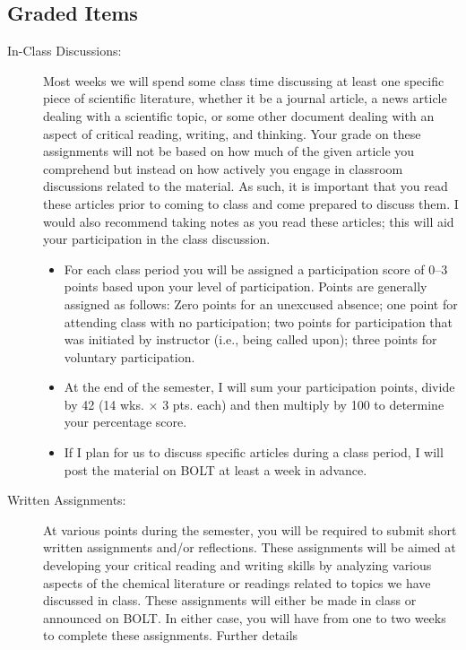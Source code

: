 \documentclass[11pt,letterpaper]{article}
\begin{document}
\subsection{Graded Items}
\begin{description}
	\item[In-Class Discussions:]
		Most weeks we will spend some class time discussing at least one
		specific piece of scientific literature, whether it be a journal
		article, a news article dealing with a scientific topic, or some
		other document dealing with an aspect of critical reading,
		writing, and thinking. Your grade on these assignments will not
		be based on how much of the given article you comprehend but
		instead on how actively you engage in classroom discussions
		related to the material. As such, it is important that you read
		these articles prior to coming to class and come prepared to
		discuss them. I would also recommend taking notes as you read
		these articles; this will aid your participation in the class
		discussion.
		\begin{itemize}
			\item For each class period you will be assigned a
				participation score of 0--3 points based upon
				your level of participation. Points are
				generally assigned as follows: Zero points for
				an unexcused absence; one point for attending
				class with no participation; two points for
				participation that was initiated by instructor
				(i.e., being called upon); three points for
				voluntary participation.
			\item At the end of the semester, I will sum your
				participation points, divide by 42 (14 wks.
				$\times$ 3
				pts. each) and then multiply by 100 to determine
				your percentage score.
			\item If I plan for us to discuss specific articles
				during a class period, I will post the material
				on BOLT at least a week in advance.
		\end{itemize}
	\item[Written Assignments:] At various points during the semester, you
		will be required to submit short written assignments and/or
		reflections. These assignments will be aimed at developing your
		critical reading and writing skills by analyzing various aspects
		of the chemical literature or readings related to topics we have
		discussed in class. These assignments will either be made in
		class or announced on BOLT. In either case, you will have from
		one to two weeks to complete these assignments. Further details

\end{description}
\end{document}
